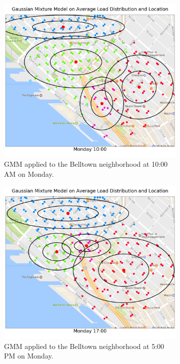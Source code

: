 \documentclass{article}
\begin{document}
\begin{figure}[H]
\begin{subfigure}[t]{0.45\textwidth}
\centering
\includegraphics[width=.99\textwidth]{../figs/monday_10am_gmm.png}
\caption{GMM applied to the Belltown neighborhood at 10:00 AM on Monday.}
\label{fig:subim1}
\end{subfigure}\hfill
\begin{subfigure}[t]{0.45\textwidth}
\centering
\includegraphics[width=.99\textwidth]{../figs/monday_5pm_gmm.png}
\caption{GMM applied to the Belltown neighborhood at 5:00 PM on Monday.}
\label{fig:subim2}
\end{subfigure}
\caption{}
\label{fig:image2}
\end{figure}
\end{document}
